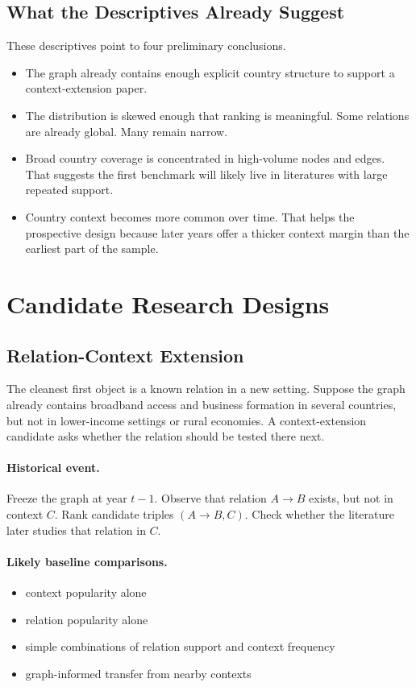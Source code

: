 \documentclass[11pt]{article}
\begin{document}
\subsection{What the Descriptives Already Suggest}
These descriptives point to four preliminary conclusions.

\begin{itemize}
    \item The graph already contains enough explicit country structure to support a context-extension paper.
    \item The distribution is skewed enough that ranking is meaningful. Some relations are already global. Many remain narrow.
    \item Broad country coverage is concentrated in high-volume nodes and edges. That suggests the first benchmark will likely live in literatures with large repeated support.
    \item Country context becomes more common over time. That helps the prospective design because later years offer a thicker context margin than the earliest part of the sample.
\end{itemize}

\section{Candidate Research Designs}
\subsection{Relation-Context Extension}
The cleanest first object is a known relation in a new setting. Suppose the graph already contains broadband access and business formation in several countries, but not in lower-income settings or rural economies. A context-extension candidate asks whether the relation should be tested there next.

\paragraph{Historical event.}
Freeze the graph at year \(t-1\). Observe that relation \(A \rightarrow B\) exists, but not in context \(C\). Rank candidate triples \((A \rightarrow B, C)\). Check whether the literature later studies that relation in \(C\).

\paragraph{Likely baseline comparisons.}
\begin{itemize}
    \item context popularity alone
    \item relation popularity alone
    \item simple combinations of relation support and context frequency
    \item graph-informed transfer from nearby contexts
\end{itemize}
\end{document}

